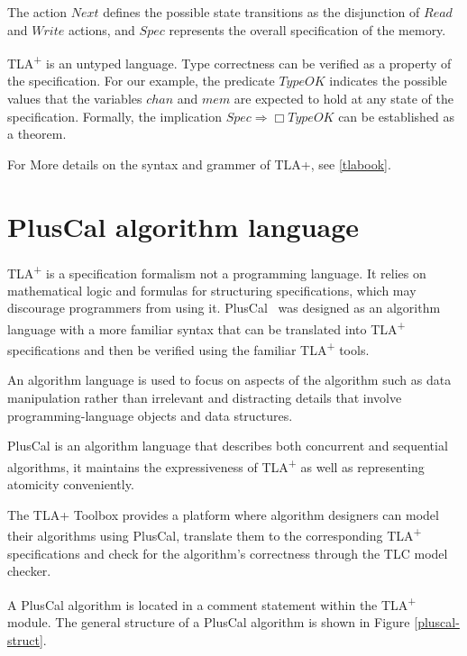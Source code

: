 \documentclass{thesul}
\newcommand{\tlaplus}{TLA\textsuperscript{+}\xspace}
\begin{document}
The action $Next$ defines the possible state transitions as the disjunction of $Read$ and $Write$ actions, and $Spec$ represents the overall specification of the memory.

\tlaplus is an untyped language. Type correctness can be verified as a property of the specification. For our example, the predicate $TypeOK$ indicates the possible values that the variables $chan$ and $mem$ are expected to hold at any state of the specification. Formally, the implication $Spec \Rightarrow \Box TypeOK$ can be established as a theorem.

\bigskip


For More details on the syntax and grammer of TLA+, see \ref{tlabook}.

\section{PlusCal algorithm language}

\tlaplus is a specification formalism not a programming language. It relies on mathematical logic and formulas for structuring specifications, which may discourage programmers from using it. PlusCal~\cite{pcalAlgo} was designed as an algorithm language with a more familiar syntax that can be translated into \tlaplus specifications and then be verified using the familiar \tlaplus tools.

An algorithm language is used to focus on aspects of the algorithm such as data manipulation rather than irrelevant and distracting details that involve programming-language objects and data structures.
	
PlusCal is an algorithm language that describes both concurrent and sequential algorithms, it maintains the expressiveness of \tlaplus as well as representing atomicity conveniently.

The TLA+ Toolbox provides a platform where algorithm designers can model their algorithms using PlusCal, translate them to the corresponding \tlaplus specifications and check for the algorithm's correctness through the TLC model checker.

A PlusCal algorithm is located in a comment statement within the \tlaplus module. The general structure of a PlusCal algorithm is shown in Figure \ref{pluscal-struct}.
\end{document}
